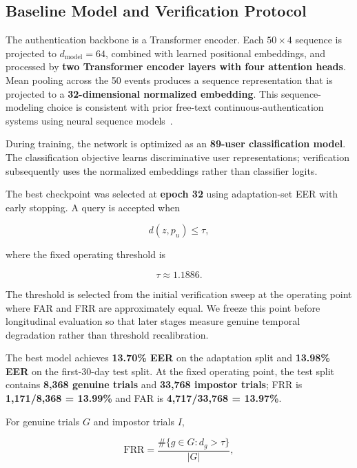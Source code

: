 \documentclass[conference]{IEEEtran}
\begin{document}
\subsection{Baseline Model and Verification Protocol}

The authentication backbone is a Transformer encoder. Each $50\times4$ sequence is projected to $d_{\mathrm{model}}=64$, combined with learned positional embeddings, and processed by \textbf{two Transformer encoder layers with four attention heads}. Mean pooling across the 50 events produces a sequence representation that is projected to a \textbf{32-dimensional normalized embedding}. This sequence-modeling choice is consistent with prior free-text continuous-authentication systems using neural sequence models~\cite{lin}.

During training, the network is optimized as an \textbf{89-user classification model}. The classification objective learns discriminative user representations; verification subsequently uses the normalized embeddings rather than classifier logits.

The best checkpoint was selected at \textbf{epoch 32} using adaptation-set EER with early stopping. A query is accepted when

\begin{equation}
d(z,p_u)\leq\tau,
\end{equation}

where the fixed operating threshold is

\begin{equation}
\tau\approx1.1886.
\end{equation}

The threshold is selected from the initial verification sweep at the operating point where FAR and FRR are approximately equal. We freeze this point before longitudinal evaluation so that later stages measure genuine temporal degradation rather than threshold recalibration.

The best model achieves \textbf{13.70\% EER} on the adaptation split and \textbf{13.98\% EER} on the first-30-day test split. At the fixed operating point, the test split contains \textbf{8,368 genuine trials} and \textbf{33,768 impostor trials}; FRR is \textbf{1,171/8,368 = 13.99\%} and FAR is \textbf{4,717/33,768 = 13.97\%}.

For genuine trials $G$ and impostor trials $I$,

\begin{equation}
\mathrm{FRR}=
\frac{\#\{g\in G:d_g>\tau\}}{|G|},
\end{equation}
\end{document}
